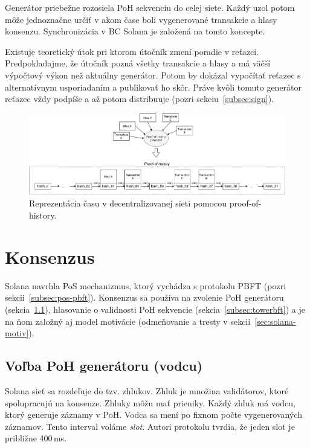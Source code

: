 Generátor priebežne rozosiela PoH sekvenciu do celej siete. Každý uzol potom môže jednoznačne určiť v akom čase boli vygenerované transakcie a hlasy konsenzu. Synchronizácia v BC Solana je založená na tomto koncepte.

Existuje teoretický útok pri ktorom útočník zmení poradie v reťazci. Predpokladajme, že útočník pozná všetky transakcie a hlasy a má väčší výpočtový výkon než aktuálny generátor. Potom by dokázal vypočítať reťazec s alternatívnym usporiadaním a publikovať ho skôr. Práve kvôli tomuto generátor reťazec vždy podpíše a až potom distribuuje (pozri sekciu~\ref{subsec:sign}).

\begin{figure}[bt]
	\centering
	\includegraphics[width=\textwidth]{obrazky-figures/solana-poh-time}
	\caption{Reprezentácia času v decentralizovanej sieti pomocou proof-of-history.}
	\label{img:solana-poh}
\end{figure}

\section{Konsenzus}\label{sec:solana-consens}

Solana navrhla PoS mechanizmus, ktorý vychádza s protokolu PBFT (pozri sekcii~\ref{subsec:pos-pbft}). Konsenzus sa používa na zvolenie PoH generátoru (sekcia~\ref{subsec:pos-generator}), hlasovanie o validnosti PoH sekvencie (sekcia~\ref{subsec:towerbft}) a je na ňom založný aj model motivácie (odmeňovanie a tresty v sekcii~\ref{sec:solana-motiv}).

\subsection{Voľba PoH generátoru (vodcu)}\label{subsec:pos-generator}

Solana sieť sa rozdeľuje do tzv. zhlukov. Zhluk je množina validátorov, ktoré spolupracujú na konsenze. Zhluky môžu mať prieniky. Každý zhluk má vodcu, ktorý generuje záznamy v PoH. Vodca sa mení po fixnom počte vygenerovaných záznamov. Tento interval voláme \textit{slot}. Autori protokolu tvrdia, že jeden slot je približne 400\,ms. 

